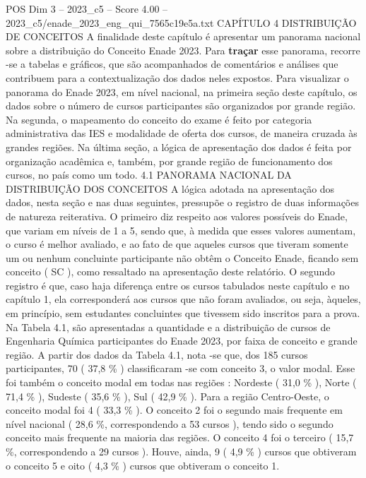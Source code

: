 \begin{textsample}{POS Dim 3 – 2023\_c5 – Score 4.00 – 2023\_c5/enade\_2023\_eng\_qui\_7565c19e5a.txt}  \label{ex:f3_pos_055}
CAPÍTULO 4 DISTRIBUIÇÃO DE CONCEITOS A finalidade deste capítulo é apresentar um panorama nacional sobre a distribuição do Conceito Enade 2023.
Para \textbf{traçar} esse panorama, recorre -se a tabelas e gráficos, que são acompanhados de comentários e análises que contribuem para a contextualização dos dados neles expostos.
Para visualizar o panorama do Enade 2023, em nível nacional, na primeira seção deste capítulo, os dados sobre o número de cursos participantes são organizados por grande região.
Na segunda, o mapeamento do conceito do exame é feito por categoria administrativa das IES e modalidade de oferta dos cursos, de maneira cruzada às grandes regiões.
Na última seção, a lógica de apresentação dos dados é feita por organização acadêmica e, também, por grande região de funcionamento dos cursos, no país como um todo. 4.1 PANORAMA NACIONAL DA DISTRIBUIÇÃO DOS CONCEITOS A lógica adotada na apresentação dos dados, nesta seção e nas duas seguintes, pressupõe o registro de duas informações de natureza reiterativa.
O primeiro diz respeito aos valores possíveis do Enade, que variam em níveis de 1 a 5, sendo que, à medida que esses valores aumentam, o curso é melhor avaliado, e ao fato de que aqueles cursos que tiveram somente um ou nenhum concluinte participante não obtêm o Conceito Enade, ficando sem conceito ( SC ), como ressaltado na apresentação deste relatório.
O segundo registro é que, caso haja diferença entre os cursos tabulados neste capítulo e no capítulo 1, ela corresponderá aos cursos que não foram avaliados, ou seja, àqueles, em princípio, sem estudantes concluintes que tivessem sido inscritos para a prova.
Na Tabela 4.1, são apresentadas a quantidade e a distribuição de cursos de Engenharia Química participantes do Enade 2023, por faixa de conceito e grande região.
A partir dos dados da Tabela 4.1, nota -se que, dos 185 cursos participantes, 70 ( 37,8 \% ) classificaram -se com conceito 3, o valor modal.
Esse foi também o conceito modal em todas nas regiões : Nordeste ( 31,0 \% ), Norte ( 71,4 \% ), Sudeste ( 35,6 \% ), Sul ( 42,9 \% ).
Para a região Centro-Oeste, o conceito modal foi 4 ( 33,3 \% ).
O conceito 2 foi o segundo mais frequente em nível nacional ( 28,6 \%, correspondendo a 53 cursos ), tendo sido o segundo conceito mais frequente na maioria das regiões.
O conceito 4 foi o terceiro ( 15,7 \%, correspondendo a 29 cursos ).
Houve, ainda, 9 ( 4,9 \% ) cursos que obtiveram o conceito 5 e oito ( 4,3 \% ) cursos que obtiveram o conceito 1.

\end{textsample}
